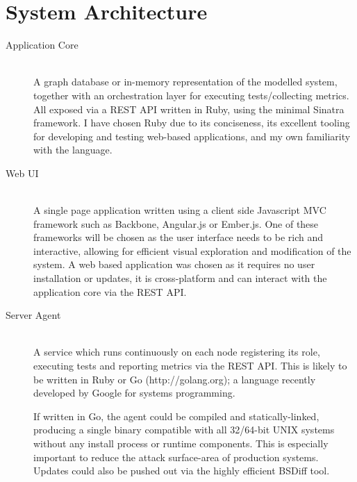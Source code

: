 \documentclass{cshonours}
\begin{document}
\section{System Architecture}
\label{section:architecture}

\begin{description}
  \item [Application Core]\hfill \\
    A graph database or in-memory representation of the modelled system, together with an orchestration layer for executing tests/collecting metrics. All exposed via a REST API written in Ruby, using the minimal Sinatra framework. I have chosen Ruby due to its conciseness, its excellent tooling for developing and testing web-based applications, and my own familiarity with the language.
  \item [Web UI]\hfill \\
    A single page application written using a client side Javascript MVC framework such as Backbone, Angular.js or Ember.js. One of these frameworks will be chosen as the user interface needs to be rich and interactive, allowing for efficient visual exploration and modification of the system. A web based application was chosen as it requires no user installation or updates, it is cross-platform and can interact with the application core via the REST API.
  \item [Server Agent]\hfill \\
    A service which runs continuously on each node registering its role, executing tests and reporting metrics via the REST API\@. This is likely to be written in Ruby or Go (http://golang.org); a language recently developed by Google for systems programming.

    If written in Go, the agent could be compiled and statically-linked, producing a single binary compatible with all 32/64-bit UNIX systems without any install process or runtime components. This is especially important to reduce the attack surface-area of production systems. Updates could also be pushed out via the highly efficient BSDiff tool.
\end{description}

\pagebreak
\end{document}
